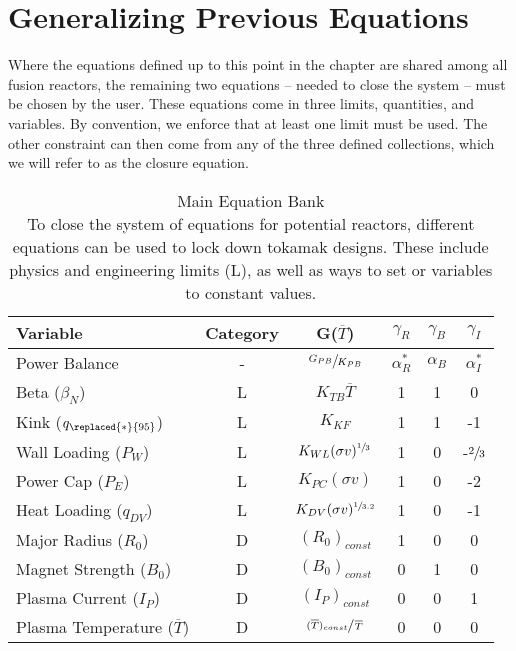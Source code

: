 \section{Generalizing Previous Equations}

Where the equations defined up to this point in the chapter are shared among all fusion reactors, the remaining two equations -- needed to close the system -- must be  chosen by the user. These  equations come in three  limits,  quantities, and  variables. By convention, we enforce that at least one limit must be used. The other constraint can then come from any of the three defined collections, which we will refer to as the closure equation.

\begin{table}[hb!]
\caption[Main Equation Bank]{Main Equation Bank \\ \small To close the system of equations for potential reactors, different equations can be used to lock down tokamak designs. These include physics and engineering limits (L), as well as ways to set  or  variables to constant values.}
\begin{spacing}{1.5}
\begin{tabular}{lccccc}
 Variable & Category & G($\overline T$)  & $\gamma_R$ & $\gamma_B$ & $\gamma_{I}$ \\ \hline
Power Balance & - & $\sfrac{ G_{PB} }{ K_{PB} }$ & $\alpha_R^*$ & $\alpha_B$ & $\alpha_I^*$ \\
Beta ($\beta_N$) & L & $K_{TB} \overline T$ & 1 & 1 & 0 \\
Kink ($q_{\replaced{*}{95}}$) & L & $K_{KF} $ & 1 & 1 & -1 \\
Wall Loading ($P_W$) & L & $K_{WL} ( \sigma v )^{\sfrac{1}{3}} $ & 1 & 0 & -$\sfrac{2}{3}$ \\
Power Cap ($P_E$) & L & $K_{PC} ( \sigma v ) $ & 1 & 0 & -2 \\
Heat Loading ($q_{DV}$) & L & $K_{DV} ( \sigma v )^{\sfrac{1}{3.2}} $ & 1 & 0 & -1 \\
Major Radius ($R_0$) & D & $(R_0)_{const}$ & 1 & 0 & 0 \\
Magnet Strength ($B_0$) & D & $(B_0)_{const}$ & 0 & 1 & 0 \\
Plasma Current ($I_P$) & D & $(I_P)_{const}$ & 0 & 0 & 1 \\
Plasma Temperature ($\overline T$) & D & $\sfrac{ (\overline T)_{const} }{ \, \overline T }$ & 0 & 0 & 0 \\

\end{tabular}
\end{spacing}
\end{table}
